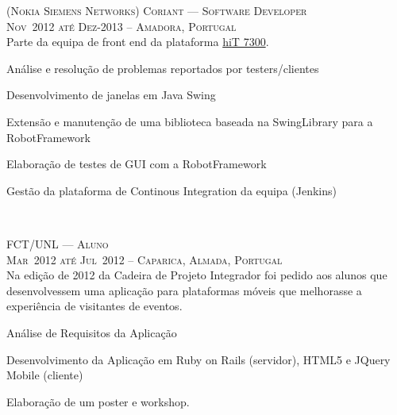 \documentclass[a4paper,fontsize=10pt]{scrartcl} %
\begin{document}
\begin{minipage}[t]{0.5\textwidth}
\textsc{(Nokia Siemens Networks) Coriant --- Software Developer}\\
\small\textsc{Nov~2012 até Dez-2013 -- Amadora, Portugal}\\ \normalsize
Parte da equipa de front end da plataforma \href{http://www.coriant.com/products/hit7300.asp}{hiT 7300}.\\
\begin{inparaitem} 
	\item[] Análise e resolu\c{c}ão de problemas reportados por testers/clientes
	\item Desenvolvimento de janelas em Java Swing
	\item Extensão e manuten\c{c}ão de uma biblioteca baseada na SwingLibrary para a RobotFramework
	\item Elaboração de testes de GUI com a RobotFramework
	\item Gestão da plataforma de Continous Integration da equipa (Jenkins)
\end{inparaitem}
\\\par


\textsc{FCT/UNL --- Aluno}\\
\small\textsc{Mar~2012 até Jul~2012 -- Caparica, Almada, Portugal}\\ \normalsize
Na edição de 2012 da Cadeira de Projeto Integrador foi pedido aos alunos que desenvolvessem uma aplicação para plataformas móveis que melhorasse a experiência de visitantes de eventos.\\
\begin{inparaitem} 
	\item[] Análise de Requisitos da Aplicação
	\item Desenvolvimento da Aplicação em Ruby on Rails (servidor), HTML5 e JQuery Mobile (cliente)
	\item Elaboração de um poster e workshop.
\end{inparaitem}
\\\par


\end{minipage}
\end{document}
